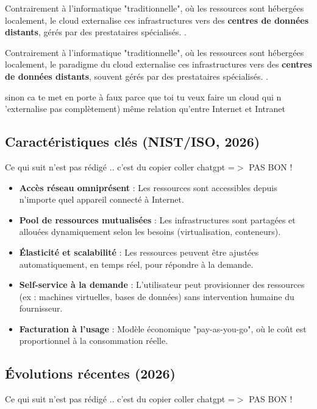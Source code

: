 \documentclass{rapportClass} %
\begin{document}
Contrairement à l’informatique "traditionnelle", où les ressources
sont hébergées localement, le cloud externalise ces infrastructures
vers des \textbf{centres de données distants}, gérés par des
prestataires spécialisés.  \cite{ISO2026,NIST2026}.


{\color{red} Contrairement à l’informatique "traditionnelle", où les ressources
sont hébergées localement, le paradigme du cloud externalise ces infrastructures
vers des \textbf{centres de données distants}, souvent gérés par des
prestataires spécialisés.  \cite{ISO2026,NIST2026}.

\medskip
sinon ca te met en porte à faux parce que toi tu veux faire un cloud qui n 'externalise pas complètement)
 même relation qu'entre Internet et Intranet}



\subsection{Caractéristiques clés (NIST/ISO, 2026)}

{\color{red} Ce qui suit n'est pas rédigé .. c'est du copier coller chatgpt  =$>$ PAS BON !}

\begin{itemize}
\item \textbf{Accès réseau omniprésent} : Les ressources sont
  accessibles depuis n’importe quel appareil connecté à Internet.
\item \textbf{Pool de ressources mutualisées} : Les infrastructures
  sont partagées et allouées dynamiquement selon les besoins
  (virtualisation, conteneurs).
\item \textbf{Élasticité et scalabilité} : Les ressources peuvent être
  ajustées automatiquement, en temps réel, pour répondre à la demande.
\item \textbf{Self-service à la demande} : L’utilisateur peut
  provisionner des ressources (ex : machines virtuelles, bases de
  données) sans intervention humaine du fournisseur.
\item \textbf{Facturation à l’usage} : Modèle économique
  "pay-as-you-go", où le coût est proportionnel à la consommation
  réelle.
\end{itemize}

\subsection{Évolutions récentes (2026)}

{\color{red} Ce qui suit n'est pas rédigé .. c'est du copier coller chatgpt  =$>$ PAS BON !}
\end{document}
